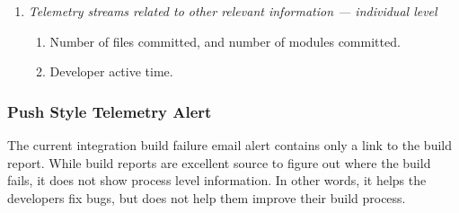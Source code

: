 \begin{enumerate}
%
%  
	
	
	
	\item \textit{Telemetry streams related to other relevant information --- individual level}
	
  \begin{enumerate}
	  \item Number of files committed, and number of modules committed.
	  \item Developer active time.
  \end{enumerate}

	   
\end{enumerate}





\subsubsection{Push Style Telemetry Alert}

The current integration build failure email alert contains only a link to the build report. While build reports are excellent source to figure out where the build fails, it does not show process level information. In other words, it helps the developers fix bugs, but does not help them improve their build process.

